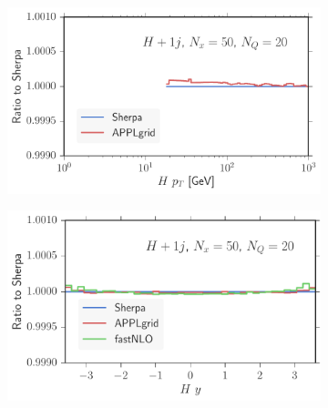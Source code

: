 %
\begin{figure}
\centering
\begin{subfigure}[]{0.49\textwidth}
	\includegraphics[width=\textwidth]{images/hjb_hpt.pdf}
\end{subfigure}
\hfill
\begin{subfigure}[]{0.49\textwidth}
	\includegraphics[width=\textwidth]{images/hjb_hy.pdf}
\end{subfigure}


\end{figure}
